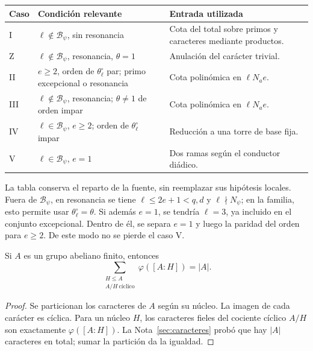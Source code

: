 \begin{center}
\small
\begin{tabularx}{\textwidth}{@{}>{\raggedright\arraybackslash}p{0.8cm}YY@{}}
\toprule
Caso & Condición relevante & Entrada utilizada\\
\midrule
I & $\ell\notin\mathcal B_\psi$, sin resonancia
  & Cota del total sobre primos y caracteres mediante productos.\\
Z & $\ell\notin\mathcal B_\psi$, resonancia, $\theta=1$
  & Anulación del carácter trivial.\\
II & $e\ge2$, orden de $\theta_\ell^\circ$ par;
       primo excepcional o resonancia
   & Cota polinómica en $\ell N_ae$.\\
III & $\ell\notin\mathcal B_\psi$, resonancia;
       $\theta\ne1$ de orden impar
    & Cota polinómica en $\ell N_ae$.\\
IV & $\ell\in\mathcal B_\psi$, $e\ge2$;
      orden de $\theta_\ell^\circ$ impar
   & Reducción a una torre de base fija.\\
V & $\ell\in\mathcal B_\psi$, $e=1$
  & Dos ramas según el conductor diádico.\\
\bottomrule
\end{tabularx}
\end{center}

La tabla conserva el reparto de la fuente, sin reemplazar
sus hipótesis locales.
Fuera de $\mathcal B_\psi$, en resonancia se tiene
$\ell\le2e+1<q,d$ y $\ell\nmid N_\psi$; en la familia,
esto permite usar $\theta_\ell^\circ=\theta$.
Si además $e=1$, se tendría $\ell=3$, ya incluido en
el conjunto excepcional.
Dentro de él, se separa $e=1$ y luego la paridad del orden
para $e\ge2$. De este modo no se pierde el caso V.

\begin{lema}
\label{lem:cohom-nucleos}
Si $A$ es un grupo abeliano finito, entonces
\[
 \sum_{\substack{H\le A\\A/H\ \text{cíclico}}}
     \varphi([A:H])=|A|.
\]
\end{lema}

\begin{proof}
Se particionan los caracteres de $A$ según su núcleo.
La imagen de cada carácter es cíclica. Para un núcleo
$H$, los caracteres fieles del cociente cíclico $A/H$
son exactamente $\varphi([A:H])$.
La Nota~\ref{sec:caracteres} probó que hay $|A|$
caracteres en total; sumar la partición da la igualdad.
\end{proof}

